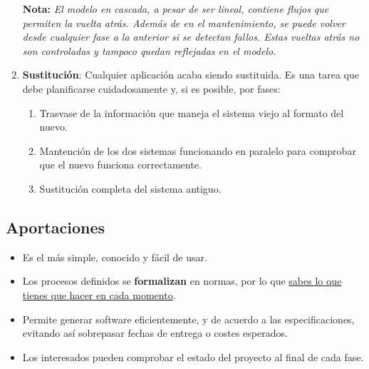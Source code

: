 \begin{enumerate}
   \textbf{Nota:} \textit{El modelo en cascada, a pesar de ser lineal, contiene flujos que permiten la vuelta atrás. Además de en el mantenimiento, se puede volver desde cualquier fase a la anterior si se detectan fallos. Estas vueltas atrás no son controladas y tampoco quedan reflejadas en el modelo.}

  \item \textbf{Sustitución}: Cualquier aplicación acaba siendo sustituida. Es una tarea que debe planificarse cuidadosamente y, si es posible, por fases:
  
  \begin{enumerate}
      \item Trasvase de la información que maneja el sistema viejo al formato del nuevo.
      \item Mantención de los dos sistemas funcionando en paralelo para comprobar que el nuevo funciona correctamente.
      \item Sustitución completa del sistema antiguo.
  \end{enumerate}
\end{enumerate}

\subsection{Aportaciones}
\begin{itemize}
   \item Es el más simple, conocido y fácil de usar.
   \item Los procesos definidos se \textbf{formalizan} en normas, por lo que \uline{sabes lo que tienes que hacer en cada momento}.
   \item Permite generar software eficientemente, y de acuerdo a las especificaciones, evitando así sobrepasar fechas de entrega o costes esperados.
   \item Los interesados pueden comprobar el estado del proyecto al final de cada fase.
\end{itemize}

